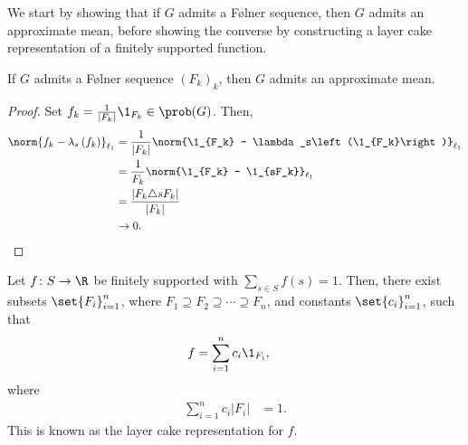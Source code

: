 We start by showing that if $G$ admits a Følner sequence, then $G$ admits an approximate mean, before showing the converse by constructing a layer cake representation of a finitely supported function.
\begin{proposition}\label{prop:folner_implies_approx_mean}
  If $G$ admits a Følner sequence $\left(F_k\right)_k$, then $G$ admits an approximate mean.
\end{proposition}
\begin{proof}
  Set $f_k = \frac{1}{\left\vert F_k \right\vert}\1_{F_k}\in \prob(G)$. Then,
  \begin{align*}
    \norm{f_k - \lambda_s\left(f_k\right)}_{\ell_1} &= \frac{1}{\left\vert F_k \right\vert} \norm{\1_{F_k} - \lambda_s\left(\1_{F_k}\right)}_{\ell_1}\\
                                                    &= \frac{1}{F_k}\norm{\1_{F_k} - \1_{sF_k}}_{\ell_1}\\
                                               &= \frac{\left\vert F_k\triangle sF_k \right\vert}{\left\vert F_k \right\vert}\\
                                               &\rightarrow 0.
  \end{align*}
\end{proof}
\begin{lemma}\label{lemma:layer_cake_representation}
  Let $f\colon S\rightarrow \R$ be finitely supported with $\sum_{s\in S}f(s) = 1$. Then, there exist subsets $\set{F_i}_{i=1}^{n}$, where $F_1\supseteq F_2\supseteq \cdots \supseteq F_n$, and constants $\set{c_i}_{i=1}^{n}$, such that
  \begin{align*}
    f &= \sum_{i=1}^{n}c_i\1_{F_i},
  \end{align*}
  where
  \begin{align*}
    \sum_{i=1}^{n}c_i\left\vert F_i \right\vert &= 1.
  \end{align*}
  This is known as the layer cake representation for $f$.
\end{lemma}
